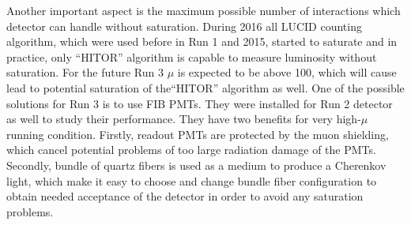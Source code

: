 Another important aspect is the maximum possible number of interactions which detector can handle without saturation. 
During 2016 all LUCID counting algorithm, which were used before in Run 1 and 2015, 
started to saturate and in practice, only ``HITOR'' algorithm is capable to measure luminosity without saturation.
For the future Run 3 $\mu$ is expected to be above 100, which will cause lead to potential saturation of the``HITOR'' algorithm as well.
One of the possible solutions for Run 3 is to use FIB PMTs. They were installed for Run 2 detector as well to study their performance.
They have two benefits for very high-$\mu$ running condition. Firstly, readout PMTs are protected by the muon shielding, which cancel potential 
problems of too large radiation damage of the PMTs. Secondly, bundle of quartz fibers is used as a medium to produce a Cherenkov light, which
make it easy to choose and change bundle fiber configuration to obtain needed acceptance of the detector in order to avoid any saturation problems.
